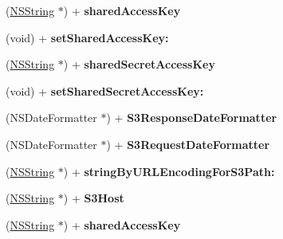 \begin{DoxyCompactItemize}
\item 
\hypertarget{interface_a_s_i_s3_request_aadbf1f29ab30efc3f4640bac7b508d32}{
(\hyperlink{class_n_s_string}{\-N\-S\-String} $\ast$) + {\bfseries shared\-Access\-Key}}
\label{interface_a_s_i_s3_request_aadbf1f29ab30efc3f4640bac7b508d32}

\item 
\hypertarget{interface_a_s_i_s3_request_ad944a2a1b20fc9e4559c8faf4f41b977}{
(void) + {\bfseries set\-Shared\-Access\-Key\-:}}
\label{interface_a_s_i_s3_request_ad944a2a1b20fc9e4559c8faf4f41b977}

\item 
\hypertarget{interface_a_s_i_s3_request_af1a72a1aacc05ce3f5def339d3bfbd5f}{
(\hyperlink{class_n_s_string}{\-N\-S\-String} $\ast$) + {\bfseries shared\-Secret\-Access\-Key}}
\label{interface_a_s_i_s3_request_af1a72a1aacc05ce3f5def339d3bfbd5f}

\item 
\hypertarget{interface_a_s_i_s3_request_aca8ba2305c0cbee1d7ec8553831768ff}{
(void) + {\bfseries set\-Shared\-Secret\-Access\-Key\-:}}
\label{interface_a_s_i_s3_request_aca8ba2305c0cbee1d7ec8553831768ff}

\item 
\hypertarget{interface_a_s_i_s3_request_ac0d60115b59954ffcc2e293c60321a74}{
(\-N\-S\-Date\-Formatter $\ast$) + {\bfseries \-S3\-Response\-Date\-Formatter}}
\label{interface_a_s_i_s3_request_ac0d60115b59954ffcc2e293c60321a74}

\item 
\hypertarget{interface_a_s_i_s3_request_ac2da1def71701c5ed345a2e119dad803}{
(\-N\-S\-Date\-Formatter $\ast$) + {\bfseries \-S3\-Request\-Date\-Formatter}}
\label{interface_a_s_i_s3_request_ac2da1def71701c5ed345a2e119dad803}

\item 
\hypertarget{interface_a_s_i_s3_request_aab8bdd9f5d8970a3bcfca36ec9dee9fb}{
(\hyperlink{class_n_s_string}{\-N\-S\-String} $\ast$) + {\bfseries string\-By\-U\-R\-L\-Encoding\-For\-S3\-Path\-:}}
\label{interface_a_s_i_s3_request_aab8bdd9f5d8970a3bcfca36ec9dee9fb}

\item 
\hypertarget{interface_a_s_i_s3_request_ae49e83f64fb2490185d0a9ff3649e1d3}{
(\hyperlink{class_n_s_string}{\-N\-S\-String} $\ast$) + {\bfseries \-S3\-Host}}
\label{interface_a_s_i_s3_request_ae49e83f64fb2490185d0a9ff3649e1d3}

\item 
\hypertarget{interface_a_s_i_s3_request_aadbf1f29ab30efc3f4640bac7b508d32}{
(\hyperlink{class_n_s_string}{\-N\-S\-String} $\ast$) + {\bfseries shared\-Access\-Key}}
\label{interface_a_s_i_s3_request_aadbf1f29ab30efc3f4640bac7b508d32}


\end{DoxyCompactItemize}
